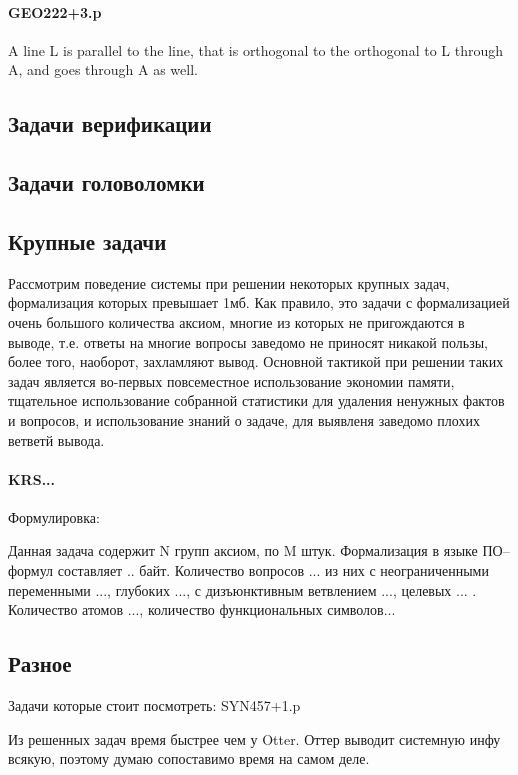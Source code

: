 \paragraph{GEO222+3.p}
A line L is parallel to the line, that is orthogonal to the orthogonal to L through A, and goes through A as well.



\subsection{Задачи верификации}

\subsection{Задачи головоломки}

\subsection{Крупные задачи}
Рассмотрим поведение системы при решении некоторых крупных задач, формализация которых превышает 1мб. Как правило, это задачи с формализацией очень большого количества аксиом, многие из которых не пригождаются в выводе, т.е. ответы на многие вопросы заведомо не приносят никакой пользы, более того, наоборот, захламляют вывод. Основной тактикой при решении таких задач является во-первых повсеместное использование экономии памяти, тщательное использование собранной статистики для удаления ненужных фактов и вопросов, и использование знаний о задаче, для выявленя заведомо плохих ветветй вывода.

\paragraph{KRS...}
Формулировка:

Данная задача содержит N групп аксиом, по M штук. Формализация в языке ПО--формул составляет .. байт. Количество вопросов ... из них с неограниченными переменными ..., глубоких ..., с дизъюнктивным ветвлением ..., целевых ... . Количество атомов ..., количество функциональных символов... 


\subsection{Разное}
Задачи которые стоит посмотреть:
SYN457+1.p

Из решенных задач время быстрее чем у Otter. Оттер выводит системную инфу всякую, поэтому думаю сопоставимо время на самом деле.

